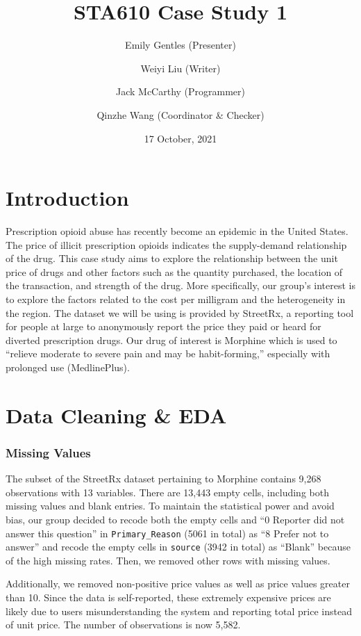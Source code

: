 \documentclass[
  11pt,
]{article}
\title{STA610 Case Study 1}
\author{Emily Gentles (Presenter) \and Weiyi Liu (Writer) \and Jack McCarthy (Programmer) \and Qinzhe Wang (Coordinator \& Checker)}
\date{17 October, 2021}
\begin{document}
\maketitle

\hypertarget{introduction}{%
\section{Introduction}\label{introduction}}

Prescription opioid abuse has recently become an epidemic in the United
States. The price of illicit prescription opioids indicates the
supply-demand relationship of the drug. This case study aims to explore
the relationship between the unit price of drugs and other factors such
as the quantity purchased, the location of the transaction, and strength
of the drug. More specifically, our group's interest is to explore the
factors related to the cost per milligram and the heterogeneity in the
region. The dataset we will be using is provided by StreetRx, a
reporting tool for people at large to anonymously report the price they
paid or heard for diverted prescription drugs. Our drug of interest is
Morphine which is used to ``relieve moderate to severe pain and may be
habit-forming,'' especially with prolonged use (MedlinePlus).

\hypertarget{data-cleaning-eda}{%
\section{Data Cleaning \& EDA}\label{data-cleaning-eda}}

\hypertarget{missing-values}{%
\subsubsection{Missing Values}\label{missing-values}}

The subset of the StreetRx dataset pertaining to Morphine contains 9,268
observations with 13 variables. There are 13,443 empty cells, including
both missing values and blank entries. To maintain the statistical power
and avoid bias, our group decided to recode both the empty cells and ``0
Reporter did not answer this question'' in \texttt{Primary\_Reason}
(5061 in total) as ``8 Prefer not to answer'' and recode the empty cells
in \texttt{source} (3942 in total) as ``Blank'' because of the high
missing rates. Then, we removed other rows with missing values.

Additionally, we removed non-positive price values as well as price
values greater than 10. Since the data is self-reported, these extremely
expensive prices are likely due to users misunderstanding the system and
reporting total price instead of unit price. The number of observations
is now 5,582.
\end{document}
